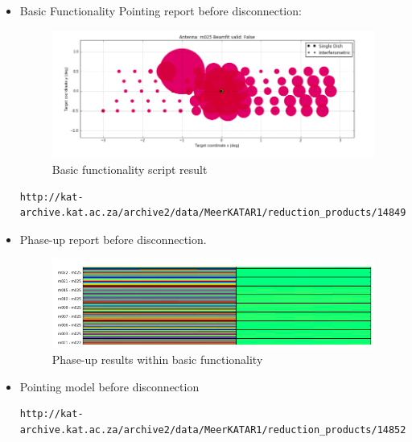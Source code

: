 \documentclass{article}
\begin{document}
{\begin{appendices}
\begin{itemize}
\begin{figure}[H]
	\caption{Tilt meter disconnect error}
	\label{fig:tilt1}
\end{figure}


\item Basic Functionality Pointing report before disconnection:
\begin{figure}[H]
	\centering
	\includegraphics[scale=0.33]{m025_basic.png}
	
	\caption{Basic functionality script result}
	\label{fig:tilt2}
\end{figure}


\begin{lstlisting}
http://kat-archive.kat.ac.za/archive2/data/MeerKATAR1/reduction_products/1484996817/obs_report_1484994649.h5.html
\end{lstlisting}






\item Phase-up report before disconnection.
\begin{figure}[H]
	\centering
	\includegraphics[scale=0.33]{m025_phase.png}
	
	\caption{Phase-up results within basic functionality}
	\label{fig:tilt3}
\end{figure}

\item Pointing model before disconnection

\begin{lstlisting}
http://kat-archive.kat.ac.za/archive2/data/MeerKATAR1/reduction_products/1485276360/obs_report_1485274430.h5.html


\end{lstlisting}
\end{itemize}
\end{appendices}}
\end{document}
